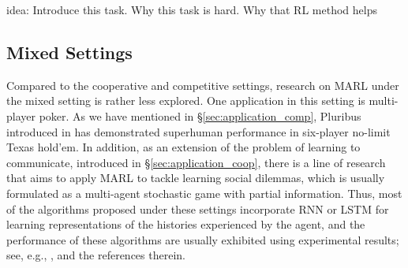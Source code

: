 {\color{red} idea: Introduce this task. Why this task is hard. Why that  RL method helps}





\fi 


 
\subsection{Mixed Settings}

Compared to the cooperative and competitive settings,  research on MARL  under the mixed setting is rather less explored. One  application in this setting is multi-player poker. As we have mentioned in \S\ref{sec:application_comp},  Pluribus introduced in  \cite{brown2019superhuman}  has  demonstrated superhuman performance in  six-player no-limit Texas hold'em.  In addition, as an extension of the problem of learning to communicate, introduced in 
\S\ref{sec:application_coop}, there is a line of research that aims to  apply MARL to tackle 
learning  social dilemmas, which is usually formulated as a multi-agent stochastic game with partial information. Thus, most of the algorithms proposed under these settings incorporate RNN or LSTM for learning representations of the histories experienced by the agent, and the performance  of  these algorithms are usually exhibited using experimental results;  see, e.g., \cite{leibo2017multi, lerer2017maintaining, hughes2018inequity}, and the references therein. 

